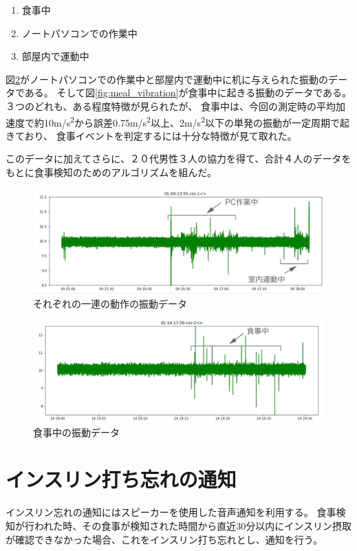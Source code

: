 \begin{enumerate}
  \item 食事中
  \item ノートパソコンでの作業中
  \item 部屋内で運動中
\end{enumerate}

図\ref{fig:activities_vibration}がノートパソコンでの作業中と部屋内で運動中に机に与えられた振動のデータである。
そして図\ref{fig:meal_vibration}が食事中に起きる振動のデータである。３つのどれも、ある程度特徴が見られたが、
食事中は、今回の測定時の平均加速度で約10\si{m/s^{2}}から誤差0.75\si{m/s^{2}}以上、2\si{m/s^{2}}以下の単発の振動が一定周期で起きており、
食事イベントを判定するには十分な特徴が見て取れた。

このデータに加えてさらに、２０代男性３人の協力を得て、合計４人のデータをもとに食事検知のためのアルゴリズムを組んだ。

\begin{figure}[htbp]
  \caption{それぞれの一連の動作の振動データ}
  \label{fig:activities_vibration}
  \begin{center}
    \includegraphics[bb=0 0 1200 300,width=20cm]{assets/pc_task_n_exercise.png}
  \end{center}
\end{figure}

\begin{figure}[htbp]
  \caption{食事中の振動データ}
  \label{fig:activities_vibration}
  \begin{center}
    \includegraphics[bb=0 0 1200 300,width=20cm]{assets/meal_vibration.png}
  \end{center}
\end{figure}

\section{インスリン打ち忘れの通知}

インスリン忘れの通知にはスピーカーを使用した音声通知を利用する。
食事検知が行われた時、その食事が検知された時間から直近30分以内にインスリン摂取が確認できなかった場合、これをインスリン打ち忘れとし、通知を行う。


